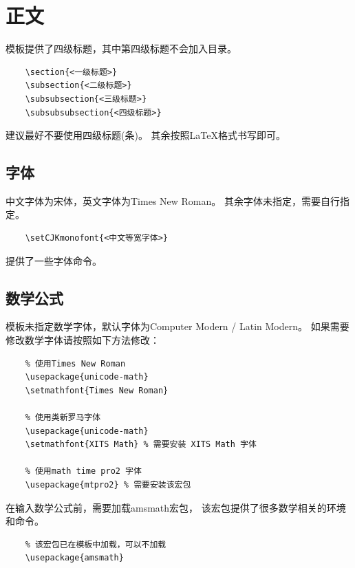 \section{正文}
模板提供了四级标题，其中第四级标题不会加入目录。
\begin{lstlisting}
    \section{<一级标题>}
    \subsection{<二级标题>}
    \subsubsection{<三级标题>}
    \subsubsubsection{<四级标题>}
\end{lstlisting}
建议最好不要使用四级标题(条)。
其余按照\LaTeX{}格式书写即可。

\subsection{字体}
中文字体为宋体，英文字体为Times New Roman。
其余字体未指定，需要自行指定。
\begin{lstlisting}
    \setCJKmonofont{<中文等宽字体>}
\end{lstlisting}

提供了一些字体命令。

\subsection{数学公式}
模板未指定数学字体，默认字体为{\ttfamily Computer Modern / Latin Modern}。
如果需要修改数学字体请按照如下方法修改：
\begin{lstlisting}
    % 使用Times New Roman
    \usepackage{unicode-math}
    \setmathfont{Times New Roman}

    % 使用类新罗马字体
    \usepackage{unicode-math}
    \setmathfont{XITS Math} % 需要安装 XITS Math 字体
    
    % 使用math time pro2 字体
    \usepackage{mtpro2} % 需要安装该宏包
\end{lstlisting}

在输入数学公式前，需要加载{\ttfamily amsmath}宏包，
该宏包提供了很多数学相关的环境和命令。
\begin{lstlisting}
    % 该宏包已在模板中加载，可以不加载
    \usepackage{amsmath}
\end{lstlisting}


